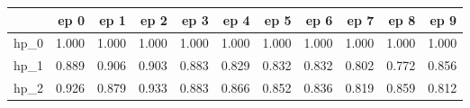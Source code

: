 \begin{tabular}{lrrrrrrrrrr}
\toprule
{} &   ep 0 &   ep 1 &   ep 2 &   ep 3 &   ep 4 &   ep 5 &   ep 6 &   ep 7 &   ep 8 &   ep 9 \\
\midrule
hp\_0 &  1.000 &  1.000 &  1.000 &  1.000 &  1.000 &  1.000 &  1.000 &  1.000 &  1.000 &  1.000 \\
hp\_1 &  0.889 &  0.906 &  0.903 &  0.883 &  0.829 &  0.832 &  0.832 &  0.802 &  0.772 &  0.856 \\
hp\_2 &  0.926 &  0.879 &  0.933 &  0.883 &  0.866 &  0.852 &  0.836 &  0.819 &  0.859 &  0.812 \\
\bottomrule
\end{tabular}
